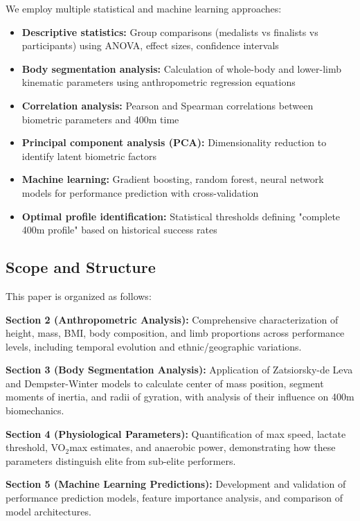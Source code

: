 \documentclass[twocolumn,10pt]{article}
\begin{document}
We employ multiple statistical and machine learning approaches:
\begin{itemize}
    \item \textbf{Descriptive statistics:} Group comparisons (medalists vs finalists vs participants) using ANOVA, effect sizes, confidence intervals
    \item \textbf{Body segmentation analysis:} Calculation of whole-body and lower-limb kinematic parameters using anthropometric regression equations
    \item \textbf{Correlation analysis:} Pearson and Spearman correlations between biometric parameters and 400m time
    \item \textbf{Principal component analysis (PCA):} Dimensionality reduction to identify latent biometric factors
    \item \textbf{Machine learning:} Gradient boosting, random forest, neural network models for performance prediction with cross-validation
    \item \textbf{Optimal profile identification:} Statistical thresholds defining "complete 400m profile" based on historical success rates
\end{itemize}

\subsection{Scope and Structure}

This paper is organized as follows:

\textbf{Section 2 (Anthropometric Analysis):} Comprehensive characterization of height, mass, BMI, body composition, and limb proportions across performance levels, including temporal evolution and ethnic/geographic variations.

\textbf{Section 3 (Body Segmentation Analysis):} Application of Zatsiorsky-de Leva and Dempster-Winter models to calculate center of mass position, segment moments of inertia, and radii of gyration, with analysis of their influence on 400m biomechanics.

\textbf{Section 4 (Physiological Parameters):} Quantification of max speed, lactate threshold, VO$_2$max estimates, and anaerobic power, demonstrating how these parameters distinguish elite from sub-elite performers.

\textbf{Section 5 (Machine Learning Predictions):} Development and validation of performance prediction models, feature importance analysis, and comparison of model architectures.
\end{document}
